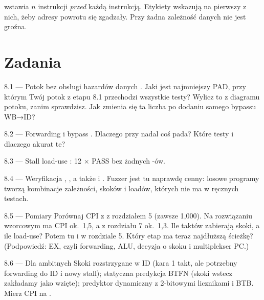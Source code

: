  wstawia $n$ instrukcji  \emph{przed} każdą instrukcją. Etykiety
wskazują na pierwszy z nich, żeby adresy powrotu  się zgadzały. Przy
 żadna zależność danych nie jest groźna.

\section{Zadania}

\begin{zadanie}{8.1 --- Potok bez obsługi hazardów danych}
. Jaki jest najmniejszy PAD, przy którym Twój potok z
etapu 8.1 przechodzi wszystkie testy? Wylicz to z diagramu potoku, zanim
sprawdzisz. Jak zmienia się ta liczba po dodaniu samego bypassu WB→ID?
\end{zadanie}

\begin{zadanie}{8.2 --- Forwarding i bypass}
. Dlaczego przy  nadal coś pada? Które testy i
dlaczego akurat te?
\end{zadanie}

\begin{zadanie}{8.3 --- Stall load-use}
: 12 × PASS bez żadnych -ów.
\end{zadanie}

\begin{zadanie}{8.4 --- Weryfikacja}
, , a także
 i
. Fuzzer jest tu naprawdę cenny:
losowe programy tworzą kombinacje zależności, skoków i loadów, których nie ma w
ręcznych testach.
\end{zadanie}

\begin{zadanie}{8.5 --- Pomiary}
Porównaj CPI z  z rozdziałem 5 (zawsze 1,000). Na rozwiązaniu
wzorcowym  ma CPI ok.\ 1,5, a  z rozdziału 7 ok.\ 1,3. Ile
taktów zabierają skoki, a ile load-use? Potem  tu i w
rozdziale 5. Który etap ma teraz najdłuższą ścieżkę? (Podpowiedź: EX, czyli
forwarding, ALU, decyzja o skoku i multiplekser PC.)
\end{zadanie}

\begin{zadanie}{8.6 --- Dla ambitnych}
Skoki rozstrzygane w ID (kara 1 takt, ale potrzebny forwarding do ID i nowy
stall); statyczna predykcja BTFN (skoki wstecz zakładamy jako wzięte);
predyktor dynamiczny z 2-bitowymi licznikami i BTB. Mierz CPI na .
\end{zadanie}

